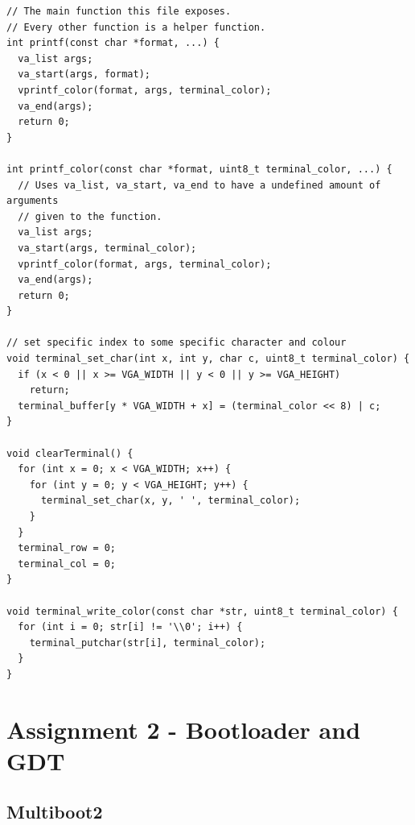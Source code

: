 \documentclass[../main.tex]{subfiles}
\begin{document}
\begin{verbatim}
// The main function this file exposes.
// Every other function is a helper function.
int printf(const char *format, ...) {
  va_list args;
  va_start(args, format);
  vprintf_color(format, args, terminal_color);
  va_end(args);
  return 0;
}

int printf_color(const char *format, uint8_t terminal_color, ...) {
  // Uses va_list, va_start, va_end to have a undefined amount of arguments
  // given to the function.
  va_list args;
  va_start(args, terminal_color);
  vprintf_color(format, args, terminal_color);
  va_end(args);
  return 0;
}

// set specific index to some specific character and colour
void terminal_set_char(int x, int y, char c, uint8_t terminal_color) {
  if (x < 0 || x >= VGA_WIDTH || y < 0 || y >= VGA_HEIGHT)
    return;
  terminal_buffer[y * VGA_WIDTH + x] = (terminal_color << 8) | c;
}

void clearTerminal() {
  for (int x = 0; x < VGA_WIDTH; x++) {
    for (int y = 0; y < VGA_HEIGHT; y++) {
      terminal_set_char(x, y, ' ', terminal_color);
    }
  }
  terminal_row = 0;
  terminal_col = 0;
}

void terminal_write_color(const char *str, uint8_t terminal_color) {
  for (int i = 0; str[i] != '\\0'; i++) {
    terminal_putchar(str[i], terminal_color);
  }
}

\end{verbatim}


\section{Assignment 2 - Bootloader and GDT}
\label{apx:assignment_2___bootloader_and_gdt}


\subsection{Multiboot2}
\label{apx:multiboot2}
\end{document}

